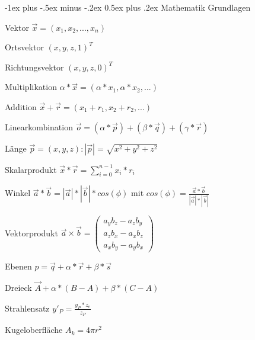 \documentclass[landscape]{article}
\makeatletter
\renewcommand{\section}{\@startsection{section}{1}{0mm}%
                                {-1ex plus -.5ex minus -.2ex}%
                                {0.5ex plus .2ex}%
                                {\normalfont\large\bfseries}}
\makeatother
\begin{document}
\raggedright
\scriptsize
\begin{multicols}{3}
  
  \setlength{\premulticols}{1pt}
  \setlength{\postmulticols}{1pt}
  \setlength{\multicolsep}{1pt}
  \setlength{\columnsep}{2pt}
  
  \section{Mathematik Grundlagen}
  \begin{description*}
    \item[Vektor] $\vec{x}=(x_1,x_2,...,x_n)$
    \begin{description*}
      \item[Ortsvektor] $(x,y,z,1)^T$
      \item[Richtungsvektor] $(x,y,z,0)^T$
    \end{description*}
    \item[Multiplikation] $\alpha * \vec{x} = (\alpha *x_1, \alpha *x_2,...)$
    \item[Addition] $\vec{x}+\vec{r}=(x_1+r_1, x_2+r_2,...)$
    \item[Linearkombination] $\vec{o} = (\alpha * \vec{p})+(\beta *\vec{q})+(\gamma * \vec{r})$
    \item[Länge] $\vec{p}=(x,y,z): |\vec{p}|=\sqrt{x^2+y^2+z^2}$
    \item[Skalarprodukt] $\vec{x}*\vec{r}=\sum_{i=0}^{n-1} x_i*r_i$
    \item[Winkel] $\vec{a}*\vec{b}=|\vec{a}|*|\vec{b}|*cos(\phi)$ mit $cos(\phi)=\frac{\vec{a}*\vec{b}}{|\vec{a}|*|\vec{b}|}$
    \item[Vektorprodukt] $\vec{a}\times\vec{b} = \begin{pmatrix} a_y b_z - a_z b_y \\ a_z b_x - a_x b_z \\ a_x b_y - a_y b_x \end{pmatrix}$
    \item[Ebenen] $p=\vec{q}+\alpha*\vec{r}+\beta * \vec{s}$
    \item[Dreieck] $\vec{A}+\alpha*(B-A)+\beta*(C-A)$
    \item[Strahlensatz] $y'_P = \frac{y_P*z_e}{z_P}$
    \item[Kugeloberfläche] $A_k = 4\pi r^2$
  \end{description*}
  

\end{multicols}
\end{document}
